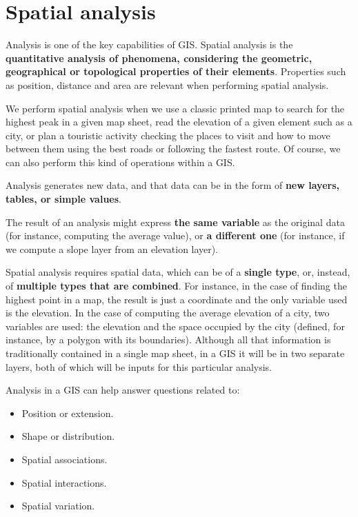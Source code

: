 
\chapter{Spatial analysis}



\pagestyle{fancy}

Analysis is one of the key capabilities of GIS. Spatial analysis is the \textbf{quantitative analysis of phenomena, considering the geometric, geographical or topological properties of their elements}. Properties such as position, distance and area are relevant when performing spatial analysis.

We perform spatial analysis when we use a classic printed map to search for the highest peak in a given map sheet, read the elevation of a given element such as a city, or plan a touristic activity checking the places to visit and how to move between them using the best roads or following the fastest route. Of course, we can also perform this kind of operations within a GIS.

Analysis generates new data, and that data can be in the form of \textbf{new layers, tables, or simple values}.

The result of an analysis might express \textbf{the same variable} as the original data (for instance, computing the average value), or \textbf{a different one} (for instance, if we compute a slope layer from an elevation layer).

Spatial analysis requires spatial data, which can be of a \textbf{single type}, or, instead, of \textbf{multiple types that are combined}. For instance, in the case of finding the highest point in a map, the result is just a coordinate and the only variable used is the elevation. In the case of computing the average elevation of a city, two variables are used: the elevation and the space occupied by the city (defined, for instance, by a polygon with its boundaries). Although all that information is traditionally contained in a single map sheet, in a GIS it will be in two separate layers, both of which will be inputs for this particular analysis.

Analysis in a GIS can help answer questions related to:

\begin{itemize}
 \item Position or extension.
\item Shape or distribution.
\item Spatial associations.
\item Spatial interactions.
\item Spatial variation.
\end{itemize}

